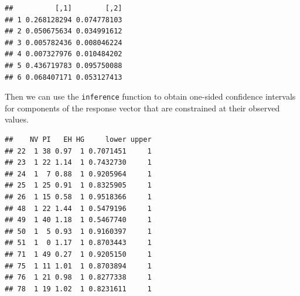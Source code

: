 \documentclass[
  ignorenonframetext,
]{beamer}
\newenvironment{Shaded}{\begin{snugshade}}{\end{snugshade}}
\newcommand{\AttributeTok}[1]{\textcolor[rgb]{0.77,0.63,0.00}{#1}}
\newcommand{\ConstantTok}[1]{\textcolor[rgb]{0.00,0.00,0.00}{#1}}
\newcommand{\DocumentationTok}[1]{\textcolor[rgb]{0.56,0.35,0.01}{\textbf{\textit{#1}}}}
\newcommand{\FunctionTok}[1]{\textcolor[rgb]{0.00,0.00,0.00}{#1}}
\newcommand{\NormalTok}[1]{#1}
\newcommand{\OtherTok}[1]{\textcolor[rgb]{0.56,0.35,0.01}{#1}}
\newcommand{\SpecialCharTok}[1]{\textcolor[rgb]{0.00,0.00,0.00}{#1}}
\newcommand{\StringTok}[1]{\textcolor[rgb]{0.31,0.60,0.02}{#1}}
\begin{document}
\begin{frame}[fragile]{}
\protect\hypertarget{section-26}{}
\tiny

\begin{Shaded}
\end{Shaded}

\begin{verbatim}
##          [,1]        [,2]
## 1 0.268128294 0.074778103
## 2 0.050675634 0.034991612
## 3 0.005782436 0.008046224
## 4 0.007327976 0.010484202
## 5 0.436719783 0.095750088
## 6 0.068407171 0.053127413
\end{verbatim}
\end{frame}

\begin{frame}[fragile]{}
\protect\hypertarget{section-27}{}
Then we can use the \texttt{inference} function to obtain one-sided
confidence intervals for components of the response vector that are
constrained at their observed values.

\vspace{12pt}
\tiny

\begin{Shaded}
\end{Shaded}

\begin{verbatim}
##    NV PI   EH HG     lower upper
## 22  1 38 0.97  1 0.7071451     1
## 23  1 22 1.14  1 0.7432730     1
## 24  1  7 0.88  1 0.9205964     1
## 25  1 25 0.91  1 0.8325905     1
## 26  1 15 0.58  1 0.9518366     1
## 48  1 22 1.44  1 0.5479196     1
## 49  1 40 1.18  1 0.5467740     1
## 50  1  5 0.93  1 0.9160397     1
## 51  1  0 1.17  1 0.8703443     1
## 71  1 49 0.27  1 0.9205150     1
## 75  1 11 1.01  1 0.8703894     1
## 76  1 21 0.98  1 0.8277338     1
## 78  1 19 1.02  1 0.8231611     1
\end{verbatim}
\end{frame}
\end{document}
